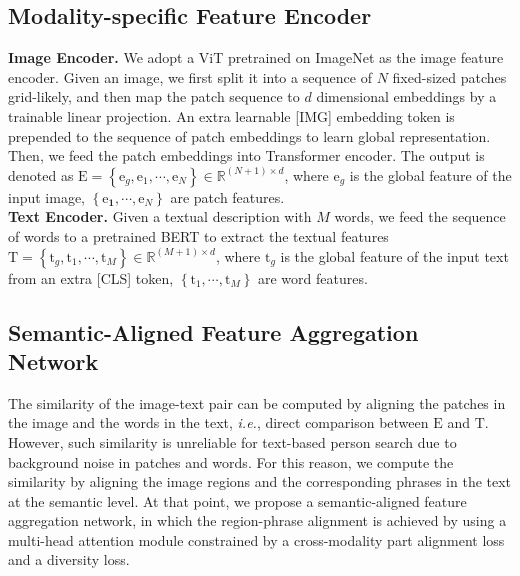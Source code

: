 \documentclass{article}
\begin{document}
\subsection{Modality-specific Feature Encoder}
  \textbf{Image Encoder.} We adopt a ViT \cite{dosovitskiy2021an} pretrained on ImageNet \cite{deng2009imagenet} as the image feature encoder. Given an image, we first split it into a sequence of $N$ fixed-sized patches grid-likely, and then map the patch sequence to $d$ dimensional embeddings by a trainable linear projection. An extra learnable [IMG] embedding token is prepended to the sequence of patch embeddings to learn global representation. Then, we feed the patch embeddings into Transformer encoder. The output is denoted as $
 \bm{\mathrm{E}}=\left\{\bm{{\mathrm{{e}}}}_{g}, \bm{\mathrm{e}}_1, \cdots, \bm{\mathrm{e}}_{N}\right\}\in \mathbb{R}^{(N+1)\times d}$, where $\bm{\mathrm{{e}}}_g$ is the global feature of the input image, $\left\{\bm{\mathrm{e}_1}, \cdots, \bm{\mathrm{e}}_N\right\}$ are patch features.\\
  \textbf{Text Encoder.}  Given a textual description with $M$ words, we feed the sequence of words to a pretrained BERT \cite{devlin2018bert} to extract the textual features $\bm{\mathrm{T}}=\left\{\bm{\mathrm{{t}}}_{g},\bm{\mathrm{t}}_1,\cdots,\bm{\mathrm{t}}_{M}\right\}\in \mathbb{R}^{(M+1)\times d}$, where $\bm{\mathrm{{t}}}_g$ is the global feature of the input text from an extra [CLS] token, $\left\{\bm{\mathrm{t}}_1, \cdots,\bm{\mathrm{t}}_{M}\right\}$ are word features.
\subsection{Semantic-Aligned Feature Aggregation Network}
The similarity of the image-text pair can be computed by aligning the patches in the image and the words in the text, \emph{i.e.}, direct comparison between $\bm{\mathrm{E}}$ and $\bm{\mathrm{T}}$. However, such similarity is unreliable for text-based
person search due to background noise in patches and words. For this reason, we compute the similarity by aligning the image regions and the corresponding phrases in the text at the semantic level. At that point, we propose a semantic-aligned feature aggregation network, in which the region-phrase alignment is achieved by using a multi-head attention \cite{vaswani2017attention} module constrained by a cross-modality part alignment loss and a diversity loss.  
\end{document}

